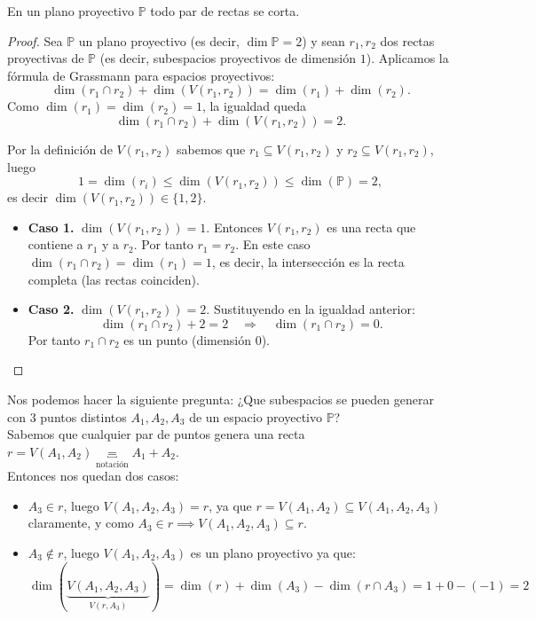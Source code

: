\begin{corolario}
    En un plano proyectivo $\mathbb{P}$ todo par de rectas se corta.
\end{corolario}

\begin{proof}
    Sea \(\mathbb{P}\) un plano proyectivo (es decir, \(\dim\mathbb{P}=2\)) y sean
    \(r_1,r_2\) dos rectas proyectivas de \(\mathbb{P}\) (es decir, subespacios proyectivos de dimensión \(1\)).
    Aplicamos la fórmula de Grassmann para espacios proyectivos:
    \[
    \dim(r_1\cap r_2)+\dim(V(r_1,r_2))=\dim(r_1)+\dim(r_2).
    \]
    Como \(\dim(r_1)=\dim(r_2)=1\), la igualdad queda
    \[
    \dim(r_1\cap r_2)+\dim(V(r_1,r_2))=2.
    \]
    
    Por la definición de $V(r_1,r_2)$ sabemos que \(r_1\subseteq V(r_1,r_2)\) y \(r_2\subseteq V(r_1,r_2)\), luego
    \[
    1=\dim(r_i)\le \dim(V(r_1,r_2))\le \dim(\mathbb{P})=2,
    \]
    es decir \(\dim(V(r_1,r_2))\in\{1,2\}\).
        
    \begin{itemize}
        \item \textbf{Caso 1.} \(\dim(V(r_1,r_2))=1\).  
        Entonces \(V(r_1,r_2)\) es una recta que contiene a \(r_1\) y a \(r_2\). Por tanto \(r_1=r_2\). En este caso
        \(\dim(r_1\cap r_2)=\dim(r_1)=1\), es decir, la intersección es la recta completa (las rectas coinciden). 
        \item \textbf{Caso 2.} \(\dim(V(r_1,r_2))=2\).  
        Sustituyendo en la igualdad anterior:
        \[
        \dim(r_1\cap r_2)+2=2 \quad\Rightarrow\quad \dim(r_1\cap r_2)=0.
        \]
        Por tanto \(r_1\cap r_2\) es un punto (dimensión \(0\)).
    \end{itemize}   
\end{proof}
    

Nos podemos hacer la siguiente pregunta: ¿Que subespacios se pueden generar con $3$ puntos distintos $A_1, A_2, A_3$ de un espacio proyectivo $\mathbb{P}$?\\
Sabemos que cualquier par de puntos genera una recta $r=V(A_1, A_2) \underbracket{=}_{\text{notación}} A_1 + A_2$.\\
Entonces nos quedan dos casos:
\begin{itemize}
    \item $A_3 \in r$, luego $V(A_1, A_2, A_3) = r$, ya que $r=V(A_1, A_2) \subseteq V(A_1, A_2, A_3)$ claramente, y como $A_3 \in r \implies V(A_1, A_2, A_3) \subseteq r$.
    \item $A_3 \notin r$, luego $V(A_1, A_2, A_3)$ es un plano proyectivo ya que:
    \[
    \dim(\underbrace{V(A_1, A_2, A_3)}_{V(r, A_3)}) = \dim(r) + \dim(A_3) - \dim(r \cap A_3) = 1 + 0 - (-1) = 2
    \]
\end{itemize}

